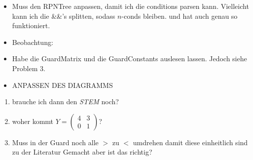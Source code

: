 \begin{itemize}
\begin{figure}[H]
		\end{figure}
	\item Muss den RPNTree anpassen, damit ich die conditions parsen kann. Vielleicht kann ich die \&\&'s splitten, sodass $n$-conds bleiben. \answer und hat auch genau so funktioniert.
	\item Beobachtung: 
	\item Habe die GuardMatrix und die GuardConstants auslesen lassen. Jedoch siehe Problem 3.
	\item ANPASSEN DES DIAGRAMMS
\end{itemize}

\begin{enumerate}
	\item brauche ich dann den \emph{STEM} noch?
	\item woher kommt $Y=\begin{pmatrix}
		4 & 3 \\ 0 & 1 
	\end{pmatrix}$?
	\item Muss in der Guard noch alle $>$ zu $<$ umdrehen damit diese einheitlich sind zu der Literatur \answer Gemacht aber ist das richtig?
\end{enumerate}
